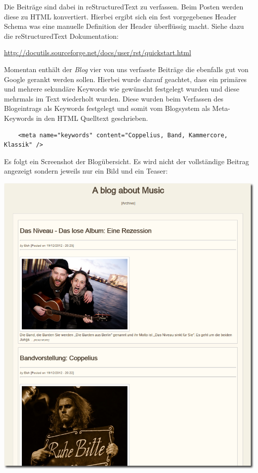 Die Beiträge sind dabei in reStructuredText zu verfassen. Beim Posten werden
diese zu HTML konvertiert. Hierbei ergibt sich ein fest vorgegebenes Header
Schema was eine manuelle Definition der Header überflüssig macht.
Siehe dazu die reStructuredText Dokumentation:

\begin{center}
\url{http://docutils.sourceforge.net/docs/user/rst/quickstart.html}
\end{center}
Momentan enthält der \emph{Blog} vier von uns verfasste Beiträge die ebenfalls gut von Google
gerankt werden sollen. Hierbei wurde darauf geachtet, dass ein primäres und
mehrere sekundäre Keywords wie gewünscht festgelegt wurden und diese mehrmals im
Text wiederholt wurden. Diese wurden beim Verfassen des Blogeintrags als
Keywords festgelegt und somit vom Blogsystem als Meta-Keywords in den HTML
Quelltext geschrieben.

\begin{verbatim}
    <meta name="keywords" content="Coppelius, Band, Kammercore, Klassik" />
\end{verbatim}

Es folgt ein Screenshot der Blogübersicht. Es wird nicht der vollständige
Beitrag angezeigt sondern jeweils nur ein Bild und ein Teaser:

\begin{center}
\includegraphics[width=\textwidth]{../screenshots/blog_overview.png}
\end{center}

